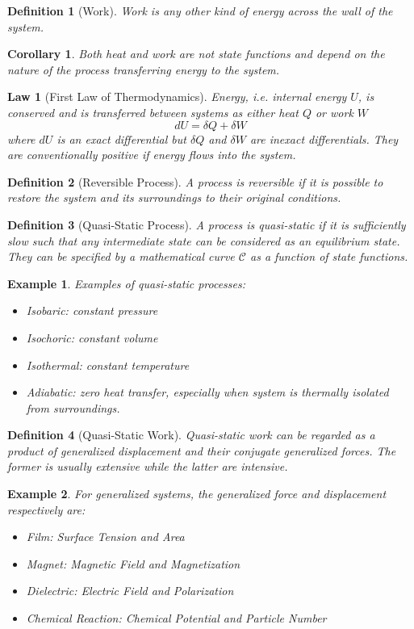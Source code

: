 \documentclass[a4paper]{article}
\newtheorem{eg}{Example}[section]
\theoremstyle{new}
\newtheorem{law}{Law}[section]
\newtheorem{defi}{Definition}[section]
\newtheorem{cor}{Corollary}[section]
\begin{document}
\begin{defi}[Work]
Work is any other kind of energy across the wall of the system.
\end{defi}
\begin{cor}
Both heat and work are not state functions and depend on the nature of the process transferring energy to the system.
\end{cor}
\begin{law}[First Law of Thermodynamics]
Energy, i.e. internal energy $U$, is conserved and is transferred between systems as either heat $Q$ or work $W$
$$dU=\delta Q+\delta W$$
where $dU$ is an exact differential but $\delta Q$ and $\delta W$ are inexact differentials. They are conventionally positive if energy flows into the system.
\end{law}
\begin{defi}[Reversible Process]
A process is reversible if it is possible to restore the system and its surroundings to their original conditions.
\end{defi}
\begin{defi}[Quasi-Static Process]
A process is quasi-static if it is sufficiently slow such that any intermediate state can be considered as an equilibrium state. They can be specified by a mathematical curve $\mathcal{C}$ as a function of state functions.
\end{defi}
\begin{eg}
Examples of quasi-static processes:
\begin{itemize}
    \item Isobaric: constant pressure
    \item Isochoric: constant volume
    \item Isothermal: constant temperature
    \item Adiabatic: zero heat transfer, especially when system is thermally isolated from surroundings.
\end{itemize}
\end{eg}
\begin{defi}[Quasi-Static Work]
Quasi-static work can be regarded as a product of generalized displacement and their conjugate generalized forces. The former is usually extensive while the latter are intensive.
\end{defi}
\begin{eg}
For generalized systems, the generalized force and displacement respectively are: 
\begin{itemize}
    \item Film: Surface Tension and Area
    \item Magnet: Magnetic Field and Magnetization
    \item Dielectric: Electric Field and Polarization
    \item Chemical Reaction: Chemical Potential and Particle Number
\end{itemize}
\end{eg}
\end{document}
